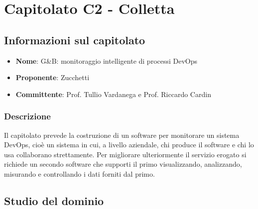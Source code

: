 \section{Capitolato C2 - Colletta}
\subsection{Informazioni sul capitolato}
\begin{itemize}
	\item \textbf{Nome}: G&B: monitoraggio intelligente di processi DevOps
	\item \textbf{Proponente}: Zucchetti
	\item \textbf{Committente}: Prof. Tullio Vardanega e Prof. Riccardo Cardin
\end{itemize}
\subsubsection{Descrizione}
Il capitolato prevede la costruzione di un software per monitorare un sistema DevOps, cioè un sistema in cui, a livello aziendale, chi produce il software e chi lo usa collaborano strettamente. Per migliorare ulteriormente il servizio erogato si richiede un secondo software che supporti il primo visualizzando, analizzando, misurando e controllando i dati forniti dal primo.
\subsection{Studio del dominio}
